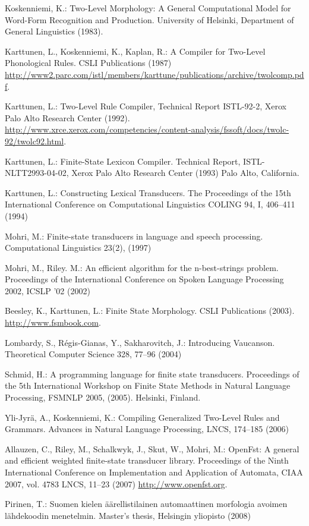 \documentclass[a4paper]{article}
\begin{document}
\begin{thebibliography}{}

Koskenniemi, K.:
Two-Level Morphology: A General Computational Model for Word-Form Recognition and Production.
University of Helsinki, Department of General Linguistics (1983).

Karttunen, L., Koskenniemi, K., Kaplan, R.: 
A Compiler for Two-Level Phonological Rules. 
CSLI Publications (1987)
\url{http://www2.parc.com/istl/members/karttune/publications/archive/twolcomp.pdf}.

Karttunen, L.:
Two-Level Rule Compiler, Technical Report ISTL-92-2, Xerox Palo Alto Research Center (1992).
\url{http://www.xrce.xerox.com/competencies/content-analysis/fssoft/docs/twolc-92/twolc92.html}.

Karttunen, L.: 
Finite-State Lexicon Compiler. 
Technical Report, ISTL-NLTT2993-04-02, Xerox Palo Alto Research Center (1993)
Palo Alto, California.

Karttunen, L.:
Constructing Lexical Transducers.
The Proceedings of the 15th International Conference on Computational Linguistics COLING 94, I, 406--411 (1994)

Mohri, M.:
Finite-state transducers in language and speech processing.
Computational Linguistics 23(2), (1997)

Mohri, M., Riley. M.:
An efficient algorithm for the n-best-strings problem.
Proceedings of the International Conference on Spoken Language Processing 2002, ICSLP '02 (2002)

Beesley, K., Karttunen, L.:
Finite State Morphology.
CSLI Publications (2003).
\url{http://www.fsmbook.com}.

Lombardy, S., R\'egis-Gianas, Y., Sakharovitch, J.:
Introducing Vaucanson. 
Theoretical Computer Science 328, 77--96 (2004)

Schmid, H.:
A programming language for finite state transducers.
Proceedings of the 5th International Workshop on Finite State Methods in Natural Language Processing, FSMNLP 2005, (2005).
Helsinki, Finland.

Yli-Jyr\"a, A., Koskenniemi, K.:
Compiling Generalized Two-Level Rules and Grammars.
Advances in Natural Language Processing, LNCS, 174--185 (2006)

Allauzen, C., Riley, M., Schalkwyk, J., Skut, W., Mohri, M.:
Open{F}st: A general and efficient weighted finite-state transducer library.
Proceedings of the Ninth International Conference on Implementation and Application of Automata, CIAA 2007, vol. 4783 LNCS, 11--23 (2007)
\url{http://www.openfst.org}.

Pirinen, T.:
Suomen kielen \"{a}\"{a}rellistilainen automaattinen morfologia avoimen l\"{a}hdekoodin menetelmin.
Master's thesis, Helsingin yliopisto (2008)

\end{thebibliography}
\clearpage
\end{document}
